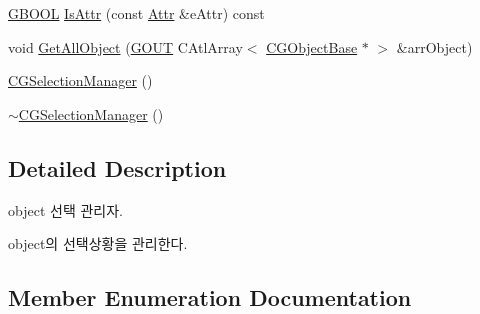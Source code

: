 \begin{DoxyCompactItemize}
\item 
\hyperlink{_g_types_8h_a2901915743626352a6820c5405f556dc}{G\+B\+O\+O\+L} \hyperlink{class_c_g_selection_manager_ae335adbc002bb35ef57e27aacac983f1}{Is\+Attr} (const \hyperlink{class_c_g_selection_manager_aab4b2c908e93e2d28ab119d441d70b18}{Attr} \&e\+Attr) const 
\item 
void \hyperlink{class_c_g_selection_manager_ad36f38abdece837bac5416c15512c726}{Get\+All\+Object} (\hyperlink{_g_types_8h_a0858ec221262e635612871d70ca233ad}{G\+O\+U\+T} C\+Atl\+Array$<$ \hyperlink{class_c_g_object_base}{C\+G\+Object\+Base} $\ast$ $>$ \&arr\+Object)
\item 
\hyperlink{class_c_g_selection_manager_a11aa3fa97a7308e8cda7d71cd80b6673}{C\+G\+Selection\+Manager} ()
\item 
\hyperlink{class_c_g_selection_manager_aac6b5710af3a1a5ead867b214f7e2268}{$\sim$\+C\+G\+Selection\+Manager} ()
\end{DoxyCompactItemize}


\subsection{Detailed Description}

\begin{DoxyItemize}
\item object 선택 관리자.
\item object의 선택상황을 관리한다. 
\end{DoxyItemize}

\subsection{Member Enumeration Documentation}
\hypertarget{class_c_g_selection_manager_aab4b2c908e93e2d28ab119d441d70b18}{}
